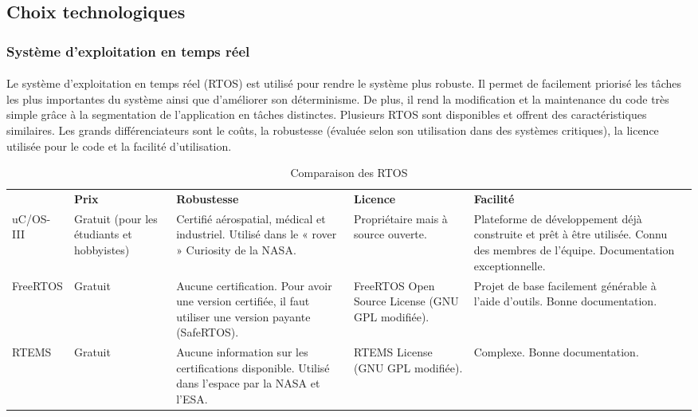 \subsection{Choix technologiques}
	\subsubsection{Système d'exploitation en temps réel}
		\paragraph*{}
		Le système d’exploitation en temps réel (RTOS) est utilisé pour rendre le système plus robuste. Il permet de facilement priorisé les tâches les plus importantes du système ainsi que d’améliorer son déterminisme. De plus, il rend la modification et la maintenance du code très simple grâce à la segmentation de l’application en tâches distinctes. Plusieurs RTOS sont disponibles et offrent des caractéristiques similaires. Les grands différenciateurs sont le coûts, la robustesse (évaluée selon son utilisation dans des systèmes critiques), la licence utilisée pour le code et la facilité d’utilisation.

		\begin{table}[H]
			\centering
			\caption{Comparaison des RTOS}
			\label{my-label}
			\begin{tabular}{|p{3cm}|p{3cm}|p{3cm}|p{3cm}|p{3cm}|}
				\hline &
				\textbf{Prix} & \textbf{Robustesse} & \textbf{Licence} & \textbf{Facilité}
				\\ \hhline{|=|=|=|=|=|}
				uC/OS-III &
				Gratuit (pour les étudiants et hobbyistes) &
				Certifié aérospatial, médical et industriel.
				Utilisé dans le « rover » Curiosity de la NASA. &
				Propriétaire mais à source ouverte. &
				Plateforme de développement déjà construite et prêt à être utilisée.
				Connu des membres de l’équipe.
				Documentation exceptionnelle.
				\\ \hline
				FreeRTOS &
				Gratuit &
				Aucune certification. Pour avoir une version certifiée, il faut utiliser une version payante (SafeRTOS). &
				FreeRTOS Open Source License (GNU GPL modifiée). &
				Projet de base facilement générable à l’aide d’outils.
				Bonne documentation.
				\\ \hline
				RTEMS &
				Gratuit &
				Aucune information sur les certifications disponible.
				Utilisé dans l’espace par la NASA et l’ESA. &
				RTEMS License (GNU GPL modifiée). &
				Complexe.
				Bonne documentation.                                                                              \\ \hline
			\end{tabular}
		\end{table}

